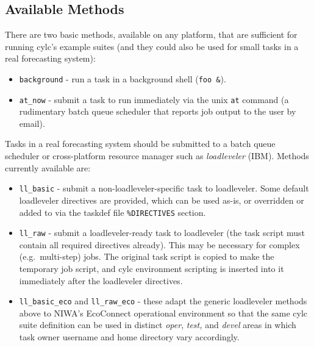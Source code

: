 \documentclass[11pt,a4paper]{article}
\begin{document}
\subsection{Available Methods}
\label{AvailableMethods}

\lstset{language=bash}

There are two basic methods, available on any platform, that are
sufficient for running cylc's example suites (and they could also be
used for small tasks in a real forecasting system): 

\begin{itemize}

    \item \lstinline=background= - run a task in a background shell
        (\lstinline=foo &=). 

     \item \lstinline=at_now= - submit a task to run immediately via the
         unix \lstinline=at= command (a rudimentary batch queue
         scheduler that reports job output to the user by email).

\end{itemize}

Tasks in a real forecasting system should be submitted to a batch queue
scheduler or cross-platform resource manager such as {\em loadleveler}
(IBM). Methods currently available are:

\lstset{language=cylctaskdef}

\begin{itemize} 
    
    \item \lstinline=ll_basic= - submit a non-loadleveler-specific task
        to loadleveler. Some default loadleveler directives are
        provided, which can be used as-is, or overridden or added to
        via the taskdef file \lstinline=%DIRECTIVES= section.

    \item \lstinline=ll_raw= - submit a loadleveler-ready task to loadleveler (the task 
        script must contain all required directives already). This may be necessary for
        complex (e.g.\ multi-step) jobs. The original task script is copied to
        make the temporary job script, and cylc environment
        scripting is inserted into it immediately after the loadleveler directives.

    \item \lstinline=ll_basic_eco= and \lstinline=ll_raw_eco= - these
        adapt the generic loadleveler methods above to NIWA's EcoConnect
        operational environment so that the same cylc suite definition
        can be used in distinct {\em oper}, {\em test,} and {\em devel}
        areas in which task owner username and home directory vary
        accordingly.

\end{itemize}
\end{document}
